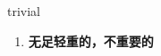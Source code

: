 
\begin{frame}
{\huge trivial}
\begin{center}
\begin{enumerate}\Large
  \item \textbf{无足轻重的，不重要的}
\end{enumerate}
\end{center}
\end{frame}
